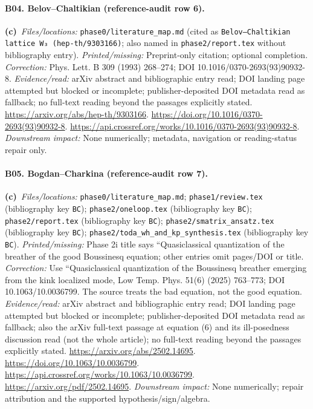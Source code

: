 \documentclass[11pt,a4paper]{article}
\newcommand{\C}{\textbf{(c)}\ }
\newcommand{\file}[1]{\nolinkurl{#1}}
\begin{document}
\paragraph{B04. Belov--Chaltikian (reference-audit row 6).}
\C \textit{Files/locations:} \file{phase0/literature_map.md} (cited as \file{Belov–Chaltikian lattice W₃ (hep-th/9303166)}; also named in \file{phase2/report.tex} without bibliography entry).
\textit{Printed/missing:} Preprint-only citation; optional completion.
\textit{Correction:} Phys. Lett. B 309 (1993) 268--274; DOI 10.1016/0370-2693(93)90932-8.
\textit{Evidence/read:} arXiv abstract and bibliographic entry read; DOI landing page attempted but blocked or incomplete; publisher-deposited DOI metadata read as fallback; no full-text reading beyond the passages explicitly stated.
\url{https://arxiv.org/abs/hep-th/9303166}.
\url{https://doi.org/10.1016/0370-2693(93)90932-8}.
\url{https://api.crossref.org/works/10.1016/0370-2693(93)90932-8}.
\textit{Downstream impact:} None numerically; metadata, navigation or reading-status repair only.
\paragraph{B05. Bogdan--Charkina (reference-audit row 7).}
\C \textit{Files/locations:} \file{phase0/literature_map.md}; \file{phase1/review.tex} (bibliography key \file{BC}); \file{phase2/oneloop.tex} (bibliography key \file{BC}); \file{phase2/report.tex} (bibliography key \file{BC}); \file{phase2/smatrix_ansatz.tex} (bibliography key \file{BC}); \file{phase2/toda_wh_and_kp_synthesis.tex} (bibliography key \file{BC}).
\textit{Printed/missing:} Phase 2i title says ``Quasiclassical quantization of the breather of the good Boussinesq equation; other entries omit pages/DOI or title.
\textit{Correction:} Use ``Quasiclassical quantization of the Boussinesq breather emerging from the kink localized mode, Low Temp. Phys. 51(6) (2025) 763--773; DOI 10.1063/10.0036799. The source treats the bad equation, not the good equation.
\textit{Evidence/read:} arXiv abstract and bibliographic entry read; DOI landing page attempted but blocked or incomplete; publisher-deposited DOI metadata read as fallback; also the arXiv full-text passage at equation (6) and its ill-posedness discussion read (not the whole article); no full-text reading beyond the passages explicitly stated.
\url{https://arxiv.org/abs/2502.14695}.
\url{https://doi.org/10.1063/10.0036799}.
\url{https://api.crossref.org/works/10.1063/10.0036799}.
\url{https://arxiv.org/pdf/2502.14695}.
\textit{Downstream impact:} None numerically; repair attribution and the supported hypothesis/sign/algebra.
\end{document}
